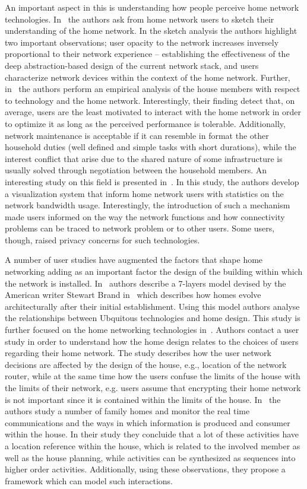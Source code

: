 An important aspect in this is understanding how people perceive home network
technologies.
In~\cite{shehanpoole08,grinter05}
the authors ask from home network users to sketch their understanding of the
home network. In the sketch analysis the authors highlight two important
observations; user opacity to the network increases inversely proportional to
their network experience -- establishing  the effectiveness of the deep
abstraction-based design of the current network stack, and users characterize
network devices within the context of the home network. Further,
in~\cite{tolmie07} the authors perform an empirical analysis of the house
members with respect to technology and the home network.  Interestingly, their
finding detect that, on average, users are the least motivated to interact with the
home network in order to optimize it as long as the perceived performance is
tolerable. Additionally, network maintenance is acceptable if it can resemble in
format the other household duties (well defined and simple tasks with short
durations), while the interest conflict that arise due to the shared nature of
some infrastructure is usually solved through negotiation between the household
members. An interesting study on this field is presented in~\cite{Chetty10}. In
this study, the authors develop a visualization system that inform home network
users with statistics on the network bandwidth usage. Interestingly, the
introduction of such a mechanism made users informed on the way the network
functions and how connectivity problems can be traced to network problem or to
other users.  Some users, though, raised privacy concerns for such technologies. 

A number of user studies have augmented the factors that shape home networking
adding as an important factor the design of the building within which the
network is installed. In~\cite{Rodden03} authors describe a 7-layers model
devised by the American writer Stewart Brand in~\cite{Brand94} which
describes how homes evolve architecturally after their initial establishment.
Using this model authors analyse the relationships between Ubquitous
technologies and home design. This study is further focused on the home
networking technologies in~\cite{chetty07}. Authors
contact a user study in order to understand how the home design relates to the
choices of users regarding their home network. The study describes how the user
network decisions are affected by the design of the house, e.g., location of the
network router, while at the same time how the users confuse the limits of the
house with the limits of their network, e.g. users assume that encrypting their
home network is not important since it is contained within the limits of the
house.  In~\cite{rodden04,crabtree03} the
authors study a number of family homes and monitor the real time communications
and the ways in which information is produced and consumer within the house. In
their study they concluide that a lot of these activities have a location
reference within the house, which is related to the involved member as well as
the house planning, while activities can be synthesized as sequences into higher
order activities. Additionally, using these observations, they propose a
framework which can model such interactions. 

